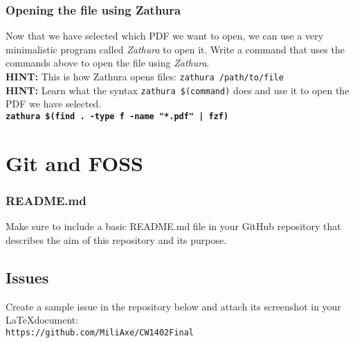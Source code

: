 \documentclass[titlepage, 12pt]{article}
\newcommand{\code}{\texttt}
\begin{document}
	\subsubsection{Opening the file using Zathura}
	Now that we have selected which PDF we want to open, we can use a very minimalistic program called \textit{Zathura} to open it. Write a command that uses the commands above to open the file using \textit{Zathura}.
	\\
	\textbf{HINT:} This is how Zathura opens files: \code{zathura /path/to/file}
	\\
	\textbf{HINT:} Learn what the syntax \code{zathura \$(command)} does and use it to open the PDF we have selected.
	\\
	\textbf{\code{zathura \$(find . -type f -name "*.pdf" | fzf)}}
	
	\section{Git and FOSS}
	
	\subsubsection{README.md}
	Make sure to include a basic README.md file in your GitHub repository that describes the aim of this repository and its purpose.
	
	\subsection{Issues}
	Create a sample issue in the repository below and attach its screenshot in your \LaTeX document:
	\\
	\code{https://github.com/MiliAxe/CW1402Final}
	\\
\end{document}
